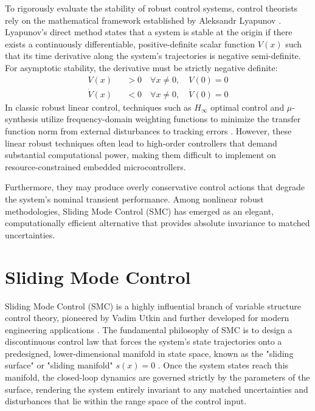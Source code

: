 To rigorously evaluate the stability of robust control systems, control theorists rely on the mathematical framework established by Aleksandr Lyapunov \cite{ref_2, ref_9}. Lyapunov's direct method states that a system is stable at the origin if there exists a continuously differentiable, positive-definite scalar function $V(x)$ such that its time derivative along the system's trajectories is negative semi-definite. For asymptotic stability, the derivative must be strictly negative definite:
\begin{align}
V(x) &&> 0 \quad \forall x \neq 0, \quad V(0) = 0 \\
\dot{V}(x) &&< 0 \quad \forall x \neq 0, \quad \dot{V}(0) = 0
\end{align}
In classic robust linear control, techniques such as $H_{\infty}$ optimal control and $\mu$-synthesis utilize frequency-domain weighting functions to minimize the transfer function norm from external disturbances to tracking errors \cite{ref_2}. However, these linear robust techniques often lead to high-order controllers that demand substantial computational power, making them difficult to implement on resource-constrained embedded microcontrollers. 

Furthermore, they may produce overly conservative control actions that degrade the system's nominal transient performance. Among nonlinear robust methodologies, Sliding Mode Control (SMC) has emerged as an elegant, computationally efficient alternative that provides absolute invariance to matched uncertainties.

\section{Sliding Mode Control}
Sliding Mode Control (SMC) is a highly influential branch of variable structure control theory, pioneered by Vadim Utkin and further developed for modern engineering applications \cite{ref_3, ref_5, ref_9}. The fundamental philosophy of SMC is to design a discontinuous control law that forces the system's state trajectories onto a predesigned, lower-dimensional manifold in state space, known as the "sliding surface" or "sliding manifold" $s(x) = 0$ \cite{ref_36}. Once the system states reach this manifold, the closed-loop dynamics are governed strictly by the parameters of the surface, rendering the system entirely invariant to any matched uncertainties and disturbances that lie within the range space of the control input.

